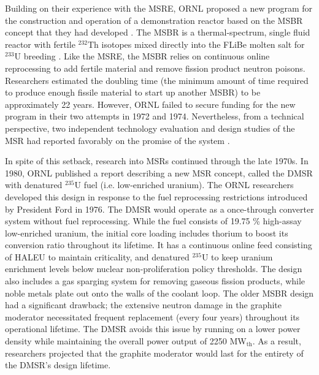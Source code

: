 Building on their experience with the \gls{MSRE}, \gls{ORNL} proposed a
new program for the construction and operation of a demonstration reactor
based on the \gls{MSBR} concept that they had
developed \cite{macpherson_molten_1985}. The \gls{MSBR} is a thermal-spectrum,
single fluid reactor with fertile $^{232}$Th isotopes mixed directly into the
FLiBe molten salt for $^{233}$U breeding \cite{gehin_liquid_2016}. Like the
\gls{MSRE}, the \gls{MSBR} relies on continuous online reprocessing to add
fertile material and remove fission product neutron poisons. Researchers
estimated the doubling time (the minimum amount of time required to produce
enough fissile material to start up another \gls{MSBR}) to be
approximately 22 years. However, \gls{ORNL} failed to secure funding for the
new program in their two attempts in 1972 and 1974. Nevertheless, from a
technical perspective, two independent
technology evaluation and design studies of the \gls{MSR} had reported
favorably on the promise of the system \cite{macpherson_molten_1985}.

In spite of this setback, research into \glspl{MSR} continued through the late
1970s. In 1980, \gls{ORNL} published a report describing a new \gls{MSR}
concept, called the \gls{DMSR} \cite{gehin_liquid_2016} with denatured
$^{235}$U fuel (i.e. low-enriched uranium). The \gls{ORNL} researchers
developed this design in response to the fuel reprocessing restrictions
introduced by President Ford in 1976. The \gls{DMSR} would operate as a
once-through
converter system without fuel reprocessing. While the fuel consists of 19.75
\% high-assay low-enriched uranium, the initial core loading includes thorium
to boost its conversion ratio throughout its lifetime. It has a continuous
online feed consisting of \gls{HALEU} to maintain criticality, and denatured
$^{235}$U to keep uranium enrichment levels below nuclear non-proliferation
policy thresholds. The design also includes a gas sparging system for removing
gaseous fission products, while noble metals plate out onto the walls of
the coolant loop. The older \gls{MSBR} design had a significant drawback; the
extensive neutron damage in the graphite moderator necessitated frequent
replacement (every four years) throughout its operational lifetime. The
\gls{DMSR} avoids this issue by running on a lower power density while
maintaining
the overall power output of 2250 MW$_{\text{th}}$. As a result, researchers
projected that the graphite moderator would last for the entirety of the
\gls{DMSR}'s design lifetime.

